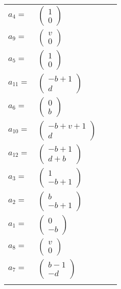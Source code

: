 \documentclass[1p]{elsarticle_modified}
\theoremstyle{definition}
\begin{document}
\begin{tabular}{m{7pt} m{180pt} m{7pt} m{180pt} }
\flushright $a_{4}=$&$\begin{pmatrix}1\\0\end{pmatrix}$ \\
\flushright $a_{9}=$&$\begin{pmatrix}v\\0\end{pmatrix}$ \\
\flushright $a_{5}=$&$\begin{pmatrix}1\\0\end{pmatrix}$ \\
\flushright $a_{11}=$&$\begin{pmatrix}- b+1\\d\end{pmatrix}$ \\
\flushright $a_{6}=$&$\begin{pmatrix}0\\b\end{pmatrix}$ \\
\flushright $a_{10}=$&$\begin{pmatrix}- b+v+1\\d\end{pmatrix}$ \\
\flushright $a_{12}=$&$\begin{pmatrix}- b+1\\d+b\end{pmatrix}$ \\
\flushright $a_{3}=$&$\begin{pmatrix}1\\- b+1\end{pmatrix}$ \\
\flushright $a_{2}=$&$\begin{pmatrix}b\\- b+1\end{pmatrix}$ \\
\flushright $a_{1}=$&$\begin{pmatrix}0\\- b\end{pmatrix}$ \\
\flushright $a_{8}=$&$\begin{pmatrix}v\\0\end{pmatrix}$ \\
\flushright $a_{7}=$&$\begin{pmatrix}b-1\\- d\end{pmatrix}$\\&\end{tabular}
\end{document}
